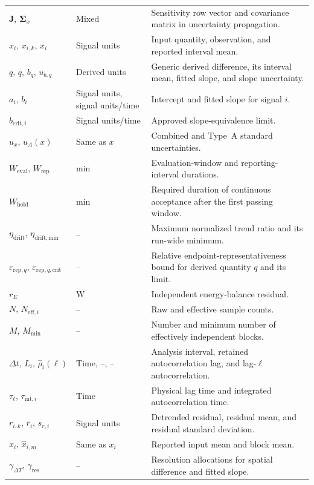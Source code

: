 \documentclass[11pt]{article}
\begin{document}
\begin{longtable}{@{}>{\raggedright\arraybackslash}p{1.62in}>{\raggedright\arraybackslash}p{1.12in}>{\raggedright\arraybackslash}p{3.76in}@{}}
$\mathbf J,\,\boldsymbol\Sigma_x$ & Mixed & Sensitivity row vector and covariance matrix in uncertainty propagation. \\
$x_i,\,x_{i,k},\,\hat x_i$ & Signal units & Input quantity, observation, and reported interval mean. \\
$q,\,\overline q,\,b_q,\,u_{b,q}$ & Derived units & Generic derived difference, its interval mean, fitted slope, and slope uncertainty. \\
$a_i,\,b_i$ & Signal units, signal units/time & Intercept and fitted slope for signal $i$. \\
$b_{\mathrm{crit},i}$ & Signal units/time & Approved slope-equivalence limit. \\
$u_x,\,u_A(x)$ & Same as $x$ & Combined and Type~A standard uncertainties. \\
$W_{\mathrm{eval}},\,W_{\mathrm{rep}}$ & \si{\minute} & Evaluation-window and reporting-interval durations. \\
$W_{\mathrm{hold}}$ & \si{\minute} & Required duration of continuous acceptance after the first passing window. \\
$\eta_{\mathrm{drift}},\,\eta_{\mathrm{drift,min}}$ & -- & Maximum normalized trend ratio and its run-wide minimum. \\
$\varepsilon_{\mathrm{rep},q},\,\varepsilon_{\mathrm{rep},q,\mathrm{crit}}$ & -- & Relative endpoint-representativeness bound for derived quantity $q$ and its limit. \\
$r_E$ & \si{\watt} & Independent energy-balance residual. \\
$N,\,N_{\mathrm{eff},i}$ & -- & Raw and effective sample counts. \\
$M,\,M_{\min}$ & -- & Number and minimum number of effectively independent blocks. \\
$\Delta t,\,L_i,\,\widehat\rho_i(\ell)$ & Time, --, -- & Analysis interval, retained autocorrelation lag, and lag-$\ell$ autocorrelation. \\
$\tau_{\ell},\,\tau_{\mathrm{int},i}$ & Time & Physical lag time and integrated autocorrelation time. \\
$r_{i,k},\,\overline r_i,\,s_{r,i}$ & Signal units & Detrended residual, residual mean, and residual standard deviation. \\
$\hat x_i,\,\hat x_{i,m}$ & Same as $x_i$ & Reported input mean and block mean. \\
$\gamma_{\Delta T},\,\gamma_{\mathrm{res}}$ & -- & Resolution allocations for spatial difference and fitted slope. \\

\end{longtable}
\end{document}
